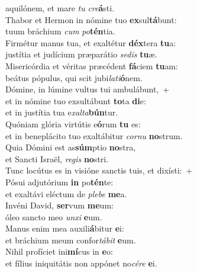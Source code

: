 \evenverse aquilónem, et mare \textit{tu} \textit{cre}\textbf{á}sti.\\
\oddverse Thabor et Hermon in nómine tuo \textbf{ex}sul\textbf{tá}bunt:~\*\\
\oddverse tuum bráchium \textit{cum} \textit{po}\textbf{tén}tia.\\
\evenverse Firmétur manus tua, et exaltétur \textbf{déx}tera \textbf{tu}a:~\*\\
\evenverse justítia et judícium præparátio \textit{se}\textit{dis} \textbf{tu}æ.\\
\oddverse Misericórdia et véritas præcédent \textbf{fá}ciem \textbf{tu}am:~\*\\
\oddverse beátus pópulus, qui scit jubi\textit{la}\textit{ti}\textbf{ó}nem.\\
\evenverse Dómine, in lúmine vultus tui ambulábunt,~+\\
\evenverse  et in nómine tuo exsultábunt \textbf{to}ta \textbf{di}e:~\*\\
\evenverse et in justítia tua e\textit{xal}\textit{ta}\textbf{bún}tur.\\
\oddverse Quóniam glória virtútis e\textbf{ó}rum \textbf{tu} es:~\*\\
\oddverse et in beneplácito tuo exaltábitur \textit{cor}\textit{nu} \textbf{no}strum.\\
\evenverse Quia Dómini est as\textbf{súm}ptio \textbf{no}stra,~\*\\
\evenverse et Sancti Israël, \textit{re}\textit{gis} \textbf{no}stri.\\
\oddverse Tunc locútus es in visióne sanctis tuis, et dixísti:~+\\
\oddverse  Pósui adjutórium \textbf{in} po\textbf{tén}te:~\*\\
\oddverse et exaltávi eléctum de \textit{ple}\textit{be} \textbf{me}a.\\
\evenverse Invéni David, \textbf{ser}vum \textbf{me}um:~\*\\
\evenverse óleo sancto meo \textit{un}\textit{xi} \textbf{e}um.\\
\oddverse Manus enim mea auxili\textbf{á}bitur \textbf{e}i:~\*\\
\oddverse et bráchium meum confor\textit{tá}\textit{bit} \textbf{e}um.\\
\evenverse Nihil profíciet ini\textbf{mí}cus in \textbf{e}o:~\*\\
\evenverse et fílius iniquitátis non appónet no\textit{cé}\textit{re} \textbf{e}i.\\
